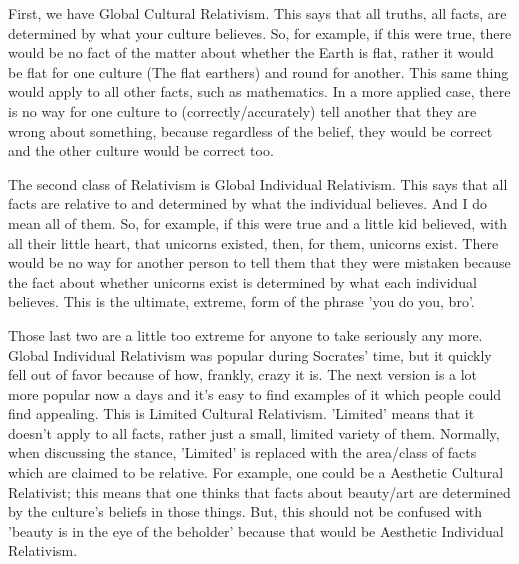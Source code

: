 First, we have Global Cultural Relativism. This says that all truths, all facts, are determined by what your culture believes. So, for example, if this were true, there would be no fact of the matter about whether the Earth is flat, rather it would be flat for one culture (The flat earthers) and round for another. This same thing would apply to all other facts, such as mathematics. In a more applied case, there is no way for one culture to (correctly/accurately) tell another that they are wrong about something, because regardless of the belief, they would be correct and the other culture would be correct too.

The second class of Relativism is Global Individual Relativism. This says that all facts are relative to and determined by what the individual believes. And I do mean all of them. So, for example, if this were true and a little kid believed, with all their little heart, that unicorns existed, then, for them, unicorns exist. There would be no way for another person to tell them that they were mistaken because the fact about whether unicorns exist is determined by what each individual believes. This is the ultimate, extreme, form of the phrase 'you do you, bro'.

Those last two are a little too extreme for anyone to take seriously any more. Global Individual Relativism was popular during Socrates' time, but it quickly fell out of favor because of how, frankly, crazy it is. The next version is a lot more popular now a days and it's easy to find examples of it which people could find appealing. This is Limited Cultural Relativism. 'Limited' means that it doesn't apply to all facts, rather just a small, limited variety of them. Normally, when discussing the stance, 'Limited' is replaced with the area/class of facts which are claimed to be relative. For example, one could be a Aesthetic Cultural Relativist; this means that one thinks that facts about beauty/art are determined by the culture's beliefs in those things. But, this should not be confused with 'beauty is in the eye of the beholder' because that would be Aesthetic Individual Relativism. 

